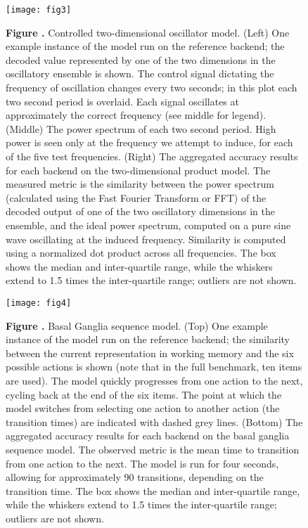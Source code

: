 \documentclass{frontiersSCNS}
\begin{document}
\begin{figure}[!ht]
\begin{center}
  \texttt{[image: fig3]}
\end{center}
\textbf{\label{fig:03} Figure .}
       {Controlled two-dimensional oscillator model. (Left) One example
         instance of the model run on the reference backend; the decoded
         value represented by one of the two dimensions in the oscillatory
         ensemble is shown. The control signal dictating the frequency of
         oscillation changes every two seconds; in this plot each two second
         period is overlaid. Each signal oscillates at approximately the
         correct frequency (see middle for legend).
         (Middle) The power spectrum of each two second period.
         High power is seen only at the frequency we attempt to induce,
         for each of the five test frequencies.
         (Right) The aggregated accuracy results for each backend on the
         two-dimensional product model. The measured metric is the similarity
         between the power spectrum (calculated using the Fast Fourier
         Transform or FFT) of the decoded output of one of the two oscillatory
         dimensions in the ensemble, and the ideal power spectrum,
         computed on a pure sine wave oscillating at the induced frequency.
         Similarity is computed using a normalized dot product across
         all frequencies. The box shows the median and
         inter-quartile range, while the whiskers extend to 1.5 times the
         inter-quartile range; outliers are not shown.}
\end{figure}

\begin{figure}[!ht]
\begin{center}
  \texttt{[image: fig4]}
\end{center}
\textbf{\label{fig:04} Figure .}
       {Basal Ganglia sequence model. (Top) One example instance
         of the model run on the reference backend; the similarity between
         the current representation in working memory and the six possible
         actions is shown (note that in the full benchmark, ten items are
         used). The model quickly progresses from one action to the next,
         cycling back at the end of the six items. The point at which the
         model switches from selecting one action to another action
         (the transition times) are indicated with dashed grey lines.
         (Bottom) The aggregated accuracy results for each backend on the
         basal ganglia sequence model. The observed metric is the mean
         time to transition from one action to the next. The model is run
         for four seconds, allowing for approximately 90 transitions, depending
         on the transition time. The box shows the median and
         inter-quartile range, while the whiskers extend to 1.5 times the
         inter-quartile range; outliers are not shown.}
\end{figure}
\end{document}
